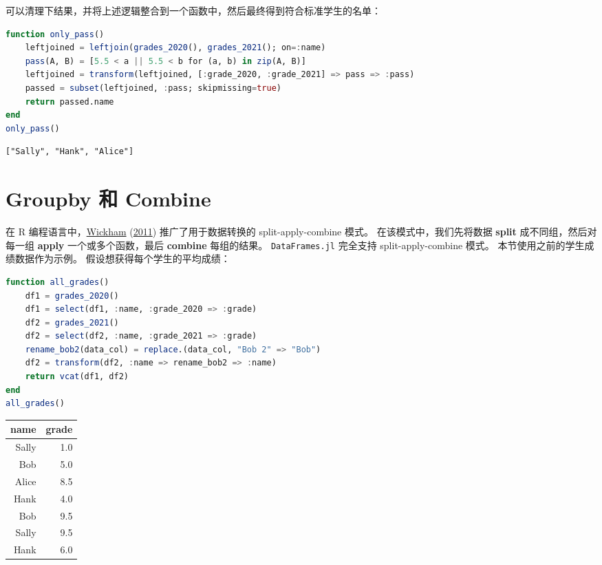 \documentclass[
  notoc %
]{tufte-book}
\newcommand{\passthrough}[1]{#1}
\begin{document}
可以清理下结果，并将上述逻辑整合到一个函数中，然后最终得到符合标准学生的名单：

\begin{lstlisting}[language=Julia]
function only_pass()
    leftjoined = leftjoin(grades_2020(), grades_2021(); on=:name)
    pass(A, B) = [5.5 < a || 5.5 < b for (a, b) in zip(A, B)]
    leftjoined = transform(leftjoined, [:grade_2020, :grade_2021] => pass => :pass)
    passed = subset(leftjoined, :pass; skipmissing=true)
    return passed.name
end
only_pass()
\end{lstlisting}

\begin{lstlisting}[language=Output]
["Sally", "Hank", "Alice"]
\end{lstlisting}

\hypertarget{sec:groupby_combine}{%
\section{Groupby 和 Combine}\label{sec:groupby_combine}}

在 R 编程语言中，\protect\hyperlink{ref-wickham2011split}{Wickham}
(\protect\hyperlink{ref-wickham2011split}{2011}) 推广了用于数据转换的
split-apply-combine 模式。 在该模式中，我们先将数据 \textbf{split}
成不同组，然后对每一组 \textbf{apply} 一个或多个函数，最后
\textbf{combine} 每组的结果。 \passthrough{\lstinline!DataFrames.jl!}
完全支持 split-apply-combine 模式。 本节使用之前的学生成绩数据作为示例。
假设想获得每个学生的平均成绩：

\begin{lstlisting}[language=Julia]
function all_grades()
    df1 = grades_2020()
    df1 = select(df1, :name, :grade_2020 => :grade)
    df2 = grades_2021()
    df2 = select(df2, :name, :grade_2021 => :grade)
    rename_bob2(data_col) = replace.(data_col, "Bob 2" => "Bob")
    df2 = transform(df2, :name => rename_bob2 => :name)
    return vcat(df1, df2)
end
all_grades()
\end{lstlisting}

\begin{longtable}[]{@{}rr@{}}
\toprule
name & grade \\
\midrule
\endhead
Sally & 1.0 \\
Bob & 5.0 \\
Alice & 8.5 \\
Hank & 4.0 \\
Bob & 9.5 \\
Sally & 9.5 \\
Hank & 6.0 \\
\bottomrule
\end{longtable}
\end{document}
